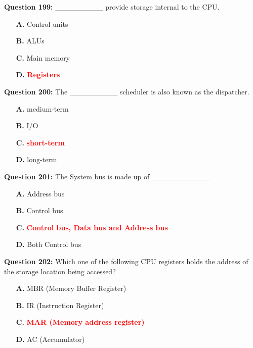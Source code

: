 \documentclass[12pt,a4paper]{article}
\begin{document}
\vspace{0.5cm}

\textbf{Question 199:} _________ provide storage internal to the CPU.

\begin{itemize}
    \item[\textbf{A.}] Control units
    \item[\textbf{B.}] ALUs
    \item[\textbf{C.}] Main memory
    \item[\textbf{D.}] \textcolor{red}{\textbf{Registers}}
\end{itemize}

\vspace{0.5cm}

\textbf{Question 200:} The _________ scheduler is also known as the dispatcher.

\begin{itemize}
    \item[\textbf{A.}] medium-term
    \item[\textbf{B.}] I/O
    \item[\textbf{C.}] \textcolor{red}{\textbf{short-term}}
    \item[\textbf{D.}] long-term
\end{itemize}

\vspace{0.5cm}

\textbf{Question 201:} The System bus is made up of ___________

\begin{itemize}
    \item[\textbf{A.}] Address bus
    \item[\textbf{B.}] Control bus
    \item[\textbf{C.}] \textcolor{red}{\textbf{Control bus, Data bus and Address bus}}
    \item[\textbf{D.}] Both Control bus
\end{itemize}

\vspace{0.5cm}

\textbf{Question 202:} Which one of the following CPU registers holds the address of the storage location being accessed?

\begin{itemize}
    \item[\textbf{A.}] MBR (Memory Buffer Register)
    \item[\textbf{B.}] IR (Instruction Register)
    \item[\textbf{C.}] \textcolor{red}{\textbf{MAR (Memory address register)}}
    \item[\textbf{D.}] AC (Accumulator)
\end{itemize}
\end{document}
